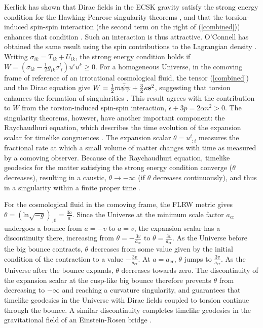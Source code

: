 \documentclass[prd,onecolumn,nofootinbib,showpacs]{revtex4}
\begin{document}
Kerlick has shown that Dirac fields in the ECSK gravity satisfy the strong energy condition for the Hawking-Penrose singularity theorems \cite{Wald}, and that the torsion-induced spin-spin interaction (the second term on the right of (\ref{combined})) enhances that condition \cite{Ker}.
Such an interaction is thus attractive.
O'Connell has obtained the same result using the spin contributions to the Lagrangian density \cite{OC}.
Writing $\sigma_{ik}=T_{ik}+U_{ik}$, the strong energy condition holds if $W=(\sigma_{ik}-\frac{1}{2}g_{ik}\sigma^l_{\phantom{l}l})u^i u^k\ge0$.
For a homogeneous Universe, in the comoving frame of reference of an irrotational cosmological fluid, the tensor (\ref{combined}) and the Dirac equation give $W=\frac{1}{2}m\bar{\psi}\psi+\frac{3}{2}\kappa{\bf s}^2$, suggesting that torsion enhances the formation of singularities \cite{Ker}.
This result agrees with the contribution to $W$ from the torsion-induced spin-spin interaction, $\tilde{\epsilon}+3\tilde{p}=2\alpha n^2>0$.
The singularity theorems, however, have another important component: the Raychaudhuri equation, which describes the time evolution of the expansion scalar for timelike congruences \cite{Ray}.
The expansion scalar $\theta=u^i_{\phantom{i}:i}$ measures the fractional rate at which a small volume of matter changes with time as measured by a comoving observer.
Because of the Raychaudhuri equation, timelike geodesics for the matter satisfying the strong energy condition converge ($\theta$ decreases), resulting in a caustic, $\theta\rightarrow -\infty$ (if $\theta$ decreases continuously), and thus in a singularity within a finite proper time \cite{Ray}.

For the cosmological fluid in the comoving frame, the FLRW metric gives $\theta=(\mbox{ln}\sqrt{-g})_{,0}=\frac{3\dot{a}}{a}$.
Since the Universe at the minimum scale factor $a_\textrm{cr}$ undergoes a bounce from $\dot{a}=-v$ to $\dot{a}=v$, the expansion scalar has a discontinuity there, increasing from $\theta=-\frac{3v}{a_\textrm{cr}}$ to $\theta=\frac{3v}{a_\textrm{cr}}$.
As the Universe before the big bounce contracts, $\theta$ decreases from some value given by the initial condition of the contraction to a value $-\frac{3v}{a_\textrm{cr}}$.
At $a=a_\textrm{cr}$, $\theta$ jumps to $\frac{3v}{a_\textrm{cr}}$.
As the Universe after the bounce expands, $\theta$ decreases towards zero.
The discontinuity of the expansion scalar at the cusp-like big bounce therefore prevents $\theta$ from decreasing to $-\infty$ and reaching a curvature singularity, and guarantees that timelike geodesics in the Universe with Dirac fields coupled to torsion continue through the bounce.
A similar discontinuity completes timelike geodesics in the gravitational field of an Einstein-Rosen bridge \cite{radial}.
\end{document}
